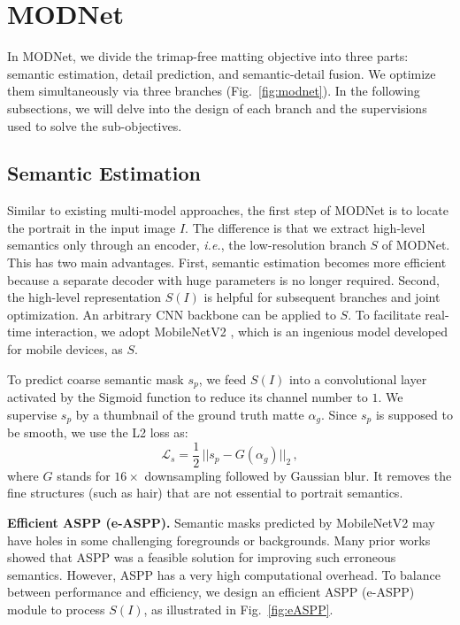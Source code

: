 \documentclass[letterpaper]{article} \usepackage{aaai22}  \usepackage{times}  \usepackage{helvet}  \usepackage{courier}  \usepackage[hyphens]{url}  \usepackage{graphicx} \urlstyle{rm} \def\UrlFont{\rm}  \usepackage{natbib}  \usepackage{caption} \usepackage{booktabs}
\begin{document}
\section{MODNet}\label{sec:3}
In MODNet, we divide the trimap-free matting objective into three parts: semantic estimation, detail prediction, and semantic-detail fusion. We optimize them simultaneously via three branches (Fig.~\ref{fig:modnet}). 
In the following subsections, we will delve into the design of each branch and the supervisions used to solve the sub-objectives.

\subsection{Semantic Estimation}\label{sec:3_2}
Similar to existing multi-model approaches, the first step of MODNet is to locate the portrait in the input image $I$. The difference is that we extract high-level semantics only through an encoder, {\it i.e.}, the low-resolution branch $S$ of MODNet. This has two main advantages. First, semantic estimation becomes more efficient because a separate decoder with huge parameters is no longer required. Second, the high-level representation $S(I)$ is helpful for subsequent branches and joint optimization. 
An arbitrary CNN backbone can be applied to $S$.
To facilitate real-time interaction, we adopt MobileNetV2 \cite{net_mobilenetv2}, which is an ingenious model developed for mobile devices, as $S$.

To predict coarse semantic mask $s_p$, we feed $S(I)$ into a convolutional layer activated by the Sigmoid function to reduce its channel number to $1$. We supervise $s_p$ by a thumbnail of the ground truth matte $\alpha_{g}$. Since $s_p$ is supposed to be smooth, we use the L2 loss as:  
\begin{equation}\label{eq:Ls}
    \mathcal{L}_{s} = \frac{1}{2} \, \big|\big| s_p - G(\alpha_g) \big|\big|_{2} \, , 
\end{equation}
where $G$ stands for $16\times$ downsampling followed by Gaussian blur. It removes the fine structures (such as hair) that are not essential to portrait semantics. 





\noindent\textbf{Efficient ASPP (e-ASPP).}
Semantic masks predicted by MobileNetV2 may have holes in some challenging foregrounds or backgrounds. Many prior works showed that ASPP was a feasible solution for improving such erroneous semantics. However, ASPP has a very high computational overhead. To balance between performance and efficiency, we design an efficient ASPP (e-ASPP) module to process $S(I)$, as illustrated in Fig.~\ref{fig:eASPP}.
\end{document}
